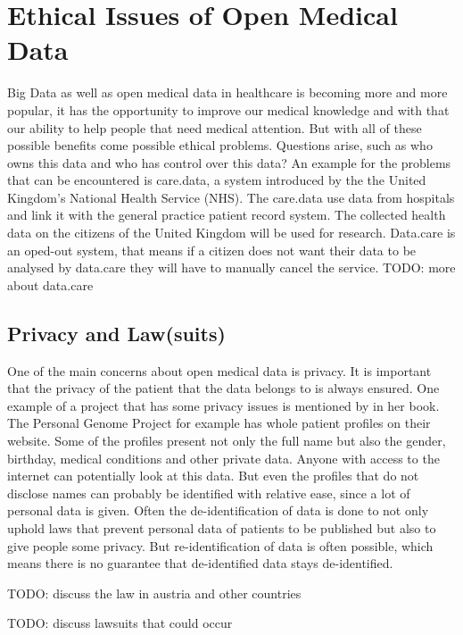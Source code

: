 \documentclass[a4paper, 11pt]{article}
\begin{document}
\section{Ethical Issues of Open Medical Data}\label{sec:ethicalIssues}
Big Data as well as open medical data in healthcare is becoming more and more popular, it has the opportunity to improve our medical knowledge and with that our ability to help people that need medical attention. But with all of these possible benefits come possible ethical problems. Questions arise, such as who owns this data and who has control over this data? An example for the problems that can be encountered is care.data, a system introduced by the the United Kingdom's National Health Service (NHS). \cite{Kostkova_et_al_2016} The care.data use data from hospitals and link it with the general practice patient record system. The collected health data on the citizens of the United Kingdom will be used for research. Data.care is an oped-out system, that means if a citizen does not want their data to be analysed by data.care they will have to manually cancel the service. \cite{Hoeksmag2014}
TODO: more about data.care 

\subsection{Privacy and Law(suits)}
One of the main concerns about open medical data is privacy. It is important that the privacy of the patient that the data belongs to is always ensured. One example of a project that has some privacy issues is mentioned by \citet{Hoffman2015} in her book. The Personal Genome Project for example has whole patient profiles on their website. \cite{ParticipantProfiles} Some of the profiles present not only the full name but also the gender, birthday, medical conditions and other private data. Anyone with access to the internet can potentially look at this data. But even the profiles that do not disclose names can probably be identified with relative ease, since a lot of personal data is given. Often the de-identification of data is done to not only uphold laws that prevent personal data of patients to be published but also to give people some privacy. But re-identification of data is often possible, which means there is no guarantee that de-identified data stays de-identified. \cite{Hoffman2015, ParticipantProfiles}

TODO: discuss the law in austria and other countries

TODO: discuss lawsuits that could occur
\cite{Hoffman2015}
\end{document}
